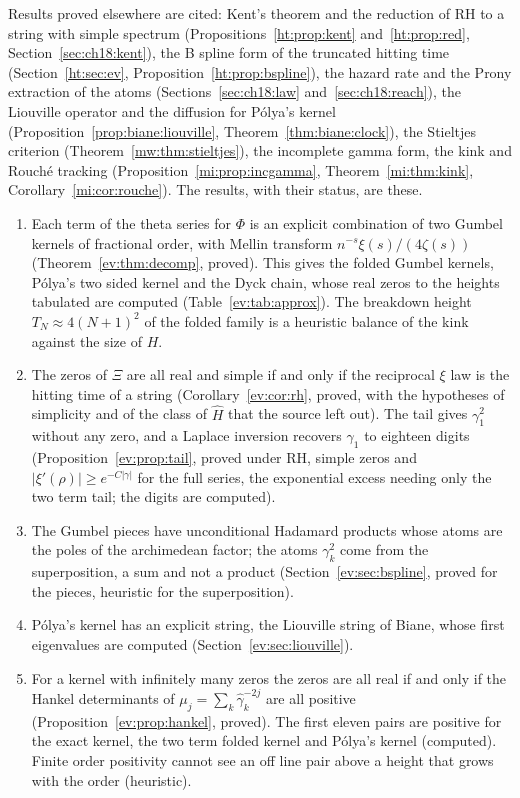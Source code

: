Results proved elsewhere are cited: Kent's theorem and the reduction of RH to a string with simple spectrum (Propositions~\ref{ht:prop:kent} and~\ref{ht:prop:red}, Section~\ref{sec:ch18:kent}), the B spline form of the truncated hitting time (Section~\ref{ht:sec:ev}, Proposition~\ref{ht:prop:bspline}), the hazard rate and the Prony extraction of the atoms (Sections~\ref{sec:ch18:law} and~\ref{sec:ch18:reach}), the Liouville operator and the diffusion for P\'olya's kernel (Proposition~\ref{prop:biane:liouville}, Theorem~\ref{thm:biane:clock}), the Stieltjes criterion (Theorem~\ref{mw:thm:stieltjes}), the incomplete gamma form, the kink and Rouch\'e tracking (Proposition~\ref{mi:prop:incgamma}, Theorem~\ref{mi:thm:kink}, Corollary~\ref{mi:cor:rouche}). The results, with their status, are these.
\begin{enumerate}
\item Each term of the theta series for $\Phi$ is an explicit combination of two Gumbel kernels of fractional order, with Mellin transform $n^{-s}\xi(s)/(4\zeta(s))$ (Theorem~\ref{ev:thm:decomp}, proved). This gives the folded Gumbel kernels, P\'olya's two sided kernel and the Dyck chain, whose real zeros to the heights tabulated are computed (Table~\ref{ev:tab:approx}). The breakdown height $T_N\approx4(N+1)^2$ of the folded family is a heuristic balance of the kink against the size of $H$.
\item The zeros of $\Xi$ are all real and simple if and only if the reciprocal $\xi$ law is the hitting time of a string (Corollary~\ref{ev:cor:rh}, proved, with the hypotheses of simplicity and of the class of $\widehat H$ that the source left out). The tail gives $\gamma_1^2$ without any zero, and a Laplace inversion recovers $\gamma_1$ to eighteen digits (Proposition~\ref{ev:prop:tail}, proved under RH, simple zeros and $|\xi'(\rho)|\ge e^{-C|\gamma|}$ for the full series, the exponential excess needing only the two term tail; the digits are computed).
\item The Gumbel pieces have unconditional Hadamard products whose atoms are the poles of the archimedean factor; the atoms $\gamma_k^2$ come from the superposition, a sum and not a product (Section~\ref{ev:sec:bspline}, proved for the pieces, heuristic for the superposition).
\item P\'olya's kernel has an explicit string, the Liouville string of Biane, whose first eigenvalues are computed (Section~\ref{ev:sec:liouville}).
\item For a kernel with infinitely many zeros the zeros are all real if and only if the Hankel determinants of $\mu_j=\sum_k\widehat\gamma_k^{-2j}$ are all positive (Proposition~\ref{ev:prop:hankel}, proved). The first eleven pairs are positive for the exact kernel, the two term folded kernel and P\'olya's kernel (computed). Finite order positivity cannot see an off line pair above a height that grows with the order (heuristic).

\end{enumerate}
